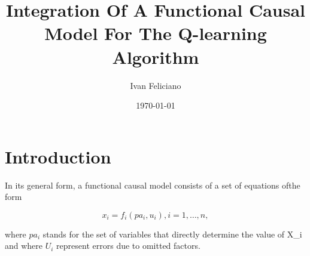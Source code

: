 \documentclass{article}
\title{Integration Of A Functional Causal Model For The Q-learning Algorithm}
\author{Ivan Feliciano}
\date{\today}
\begin{document}
\maketitle

\section{Introduction}

In its general form, a functional causal model consists of a set of equations ofthe form

\[
x_i = f_i(pa_i, u_i), i = 1, \dots, n,
\]

where $pa_i$ stands for the set of variables that directly determine the value 
of X_i and where  $U_i$ represent errors due to omitted factors. 
\end{document}
